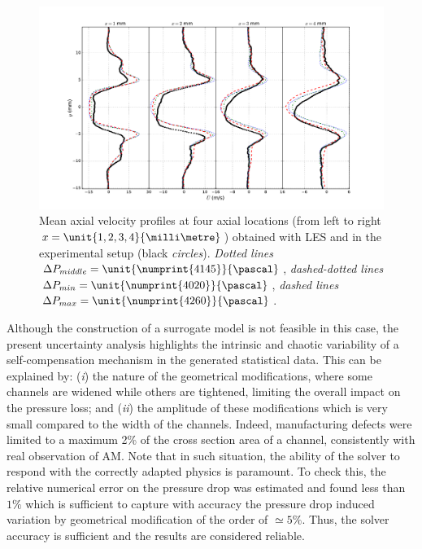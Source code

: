 \begin{figure}[!ht]
\centering
\includegraphics[width=\linewidth,keepaspectratio]{fig/applications/swirler/profile_u.pdf}
\caption{Mean axial velocity profiles at four axial locations (from left to right $x = \unit{1, 2, 3, 4}{\milli\metre}$) obtained with LES and in the experimental setup (black \emph{circles}). \emph{Dotted lines} $\Delta P_{middle} =\unit{\numprint{4145}}{\pascal} $, \emph{dashed-dotted lines}$\Delta P_{min} =\unit{\numprint{4020}}{\pascal} $, \emph{dashed lines} $\Delta P_{max} = \unit{\numprint{4260}}{\pascal}$.}
\label{fig:profile-u}
\end{figure}



Although the construction of a surrogate model is not feasible in this case, the present uncertainty analysis highlights the intrinsic and chaotic variability of a self-compensation mechanism in the generated statistical data. This can be explained by: (\emph{i}) the nature of the geometrical modifications, where some channels are widened while others are tightened, limiting the overall impact on the pressure loss; and (\emph{ii}) the amplitude of these modifications which is very small compared to the width of the channels. Indeed, manufacturing defects were limited to a maximum 2\% of the cross section area of a channel, consistently with real observation of AM. Note that in such situation, the ability of the solver to respond with the correctly adapted physics is paramount. To check this, the relative numerical error on the pressure drop was estimated and found less than $1\%$ which is sufficient to capture with accuracy the pressure drop induced variation by geometrical modification of the order of $\simeq 5\%$. Thus, the solver accuracy is sufficient and the results are considered reliable.

